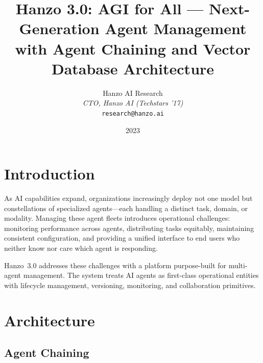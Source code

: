 \documentclass[11pt,twocolumn]{article}
\title{Hanzo 3.0: AGI for All --- Next-Generation Agent Management with Agent
Chaining and Vector Database Architecture}
\author{
    Hanzo AI Research \\
    \textit{CTO, Hanzo AI (Techstars '17)} \\
    \texttt{research@hanzo.ai}
}
\date{2023}
\begin{document}
\hanzocoverpage


\section{Introduction}
\label{sec:intro}

As AI capabilities expand, organizations increasingly deploy not one model but
constellations of specialized agents---each handling a distinct task, domain, or
modality. Managing these agent fleets introduces operational challenges:
monitoring performance across agents, distributing tasks equitably, maintaining
consistent configuration, and providing a unified interface to end users who
neither know nor care which agent is responding.

Hanzo~3.0 addresses these challenges with a platform purpose-built for
multi-agent management. The system treats AI agents as first-class operational
entities with lifecycle management, versioning, monitoring, and collaboration
primitives.

\section{Architecture}
\label{sec:architecture}

\subsection{Agent Chaining}
\end{document}

